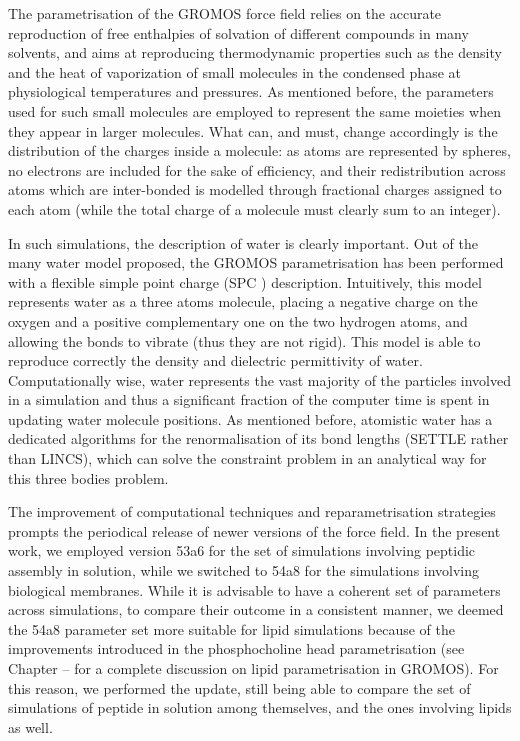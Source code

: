 The parametrisation of the GROMOS force field relies on the accurate reproduction of free enthalpies of solvation of different compounds in many solvents, and aims at reproducing thermodynamic properties such as the density and the heat of vaporization of small molecules in the condensed phase at physiological temperatures and pressures.
%
As mentioned before, the parameters used for such small molecules are employed to represent the same moieties when they appear in larger molecules. What can, and must, change accordingly is the distribution of the charges inside a molecule: as atoms are represented by spheres, no electrons are included for the sake of efficiency, and their redistribution across atoms which are inter-bonded is modelled through fractional charges assigned to each atom (while the total charge of a molecule must clearly sum to an integer).

In such simulations, the description of water is clearly important. Out of the many water model proposed, the GROMOS parametrisation has been performed with a flexible simple point charge (SPC \cite{Berendsen1981}) description. Intuitively, this model represents water as a three atoms molecule, placing a negative charge on the oxygen and a positive complementary one on the two hydrogen atoms, and allowing the bonds to vibrate (thus they are not rigid). This model is able to reproduce correctly the density and dielectric permittivity of water. Computationally wise, water represents the vast majority of the particles involved in a simulation and thus a significant fraction of the computer time is spent in updating water molecule positions.
%
As mentioned before, atomistic water has a dedicated algorithms for the renormalisation of its bond lengths (SETTLE rather than LINCS), which can solve the constraint problem in an analytical way for this three bodies problem.

The improvement of computational techniques and reparametrisation strategies prompts the periodical release of newer versions of the force field. In the present work, we employed version 53a6 \cite{Oostenbrink2004} for the set of simulations involving peptidic assembly in solution, while we switched to 54a8 \cite{Schmid2011} for the simulations involving biological membranes. While it is advisable to have a coherent set of parameters across simulations, to compare their outcome in a consistent manner, we deemed the 54a8 parameter set more suitable for lipid simulations because of the improvements introduced in the phosphocholine head parametrisation (see Chapter -- for a complete discussion on lipid parametrisation in GROMOS). For this reason, we performed the update, still being able to compare the set of simulations of peptide in solution among themselves, and the ones involving lipids as well.


